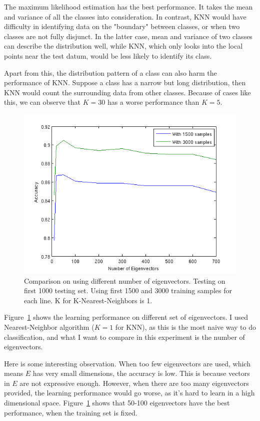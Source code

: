 \documentclass[10pt]{article}
\begin{document}
The maximum likelihood estimation has the best performance. It takes
the mean and variance of all the classes into consideration. In
contrast, KNN would have difficulty in identifying data on the
"boundary" between classes, or when two classes are not fully
disjunct. In the latter case, mean and variance of two classes can
describe the distribution well, while KNN, which only looks into the
local points near the test datum, would be less likely to identify its
class.

Apart from this, the distribution pattern of a class can also
harm the performance of KNN\@. Suppose a class has a narrow but long
distribution, then KNN would count the surrounding data from other
classes. Because of cases like this, we can observe that $K=30$ has a
worse performance than $K=5$.

\hfill

\begin{figure}
\centering
\includegraphics[width=0.55\columnwidth]{diffEVector.png}
\caption{Comparison on using different number of eigenvectors.
Testing on first 1000 testing set. Using first 1500 and 3000 training
samples for each line.  K for K-Nearest-Neighbors is 1.}
\label{fig:evec}
\end{figure}

Figure~\ref{fig:evec} shows the learning performance on different set
of eigenvectors. I used Nearest-Neighbor algorithm ($K = 1$ for KNN),
as this is the most naive way to do classification, and what I want to
compare in this experiment is the number of eigenvectors.

Here is some interesting observation. When too few
eigenvectors are used, which means $E$ has very small dimensions, the
accuracy is low. This is because vectors in $E$ are not expressive
enough. However, when there are too many eigenvectors provided, the
learning performance would go worse, as it's hard to learn in a high
dimensional space.  Figure~\ref{fig:evec} shows that 50-100
eigenvectors have the best performance, when the training set is
fixed.
\end{document}
